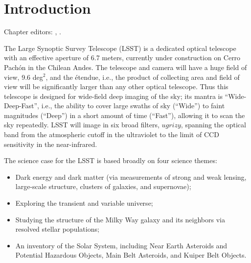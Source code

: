 \chapter[Introduction]{Introduction}
\def\chpname{intro}\label{chp:\chpname}

Chapter editors:
,
.

The Large Synoptic Survey Telescope (LSST) is a dedicated optical
telescope with an effective aperture of 6.7 meters, currently under
construction on Cerro Pach\'on in the Chilean Andes.  The telescope
and camera will have a huge field of view, 9.6 deg$^2$, and the
\'etendue, i.e., the product of collecting area and field of view will
be significantly larger than any other optical telescope.  Thus this telescope
is designed for wide-field deep imaging of the sky; its mantra is
``Wide-Deep-Fast'', i.e., the ability to cover large swaths of sky
(``Wide'') to faint magnitudes (``Deep'') in a short amount of time
(``Fast''), allowing it to scan the sky repeatedly.  LSST will image
in six broad filters, $ugrizy$, spanning the optical band from the
atmospheric cutoff in the ultraviolet to the limit of CCD sensitivity
in the near-infrared.  

  The science case for the LSST is based broadly on four science
  themes:
\begin{itemize}
\item Dark energy and dark matter (via measurements of strong and weak lensing,
  large-scale structure, clusters of galaxies, and supernovae);
\item Exploring the transient and variable universe;
\item Studying the structure of the Milky Way galaxy and its neighbors
  via resolved stellar populations;
\item An inventory of the Solar System, including Near Earth Asteroids
  and Potential Hazardous Objects, Main Belt Asteroids, and
  Kuiper Belt Objects.
\end{itemize}


